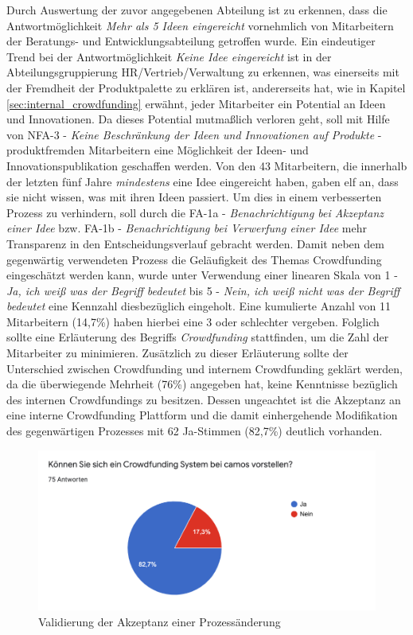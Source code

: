 Durch Auswertung der zuvor angegebenen Abteilung ist zu erkennen, dass die Antwortmöglichkeit \emph{Mehr als 5 Ideen eingereicht} vornehmlich von Mitarbeitern der Beratungs- und Entwicklungsabteilung getroffen wurde. Ein eindeutiger Trend bei der Antwortmöglichkeit \emph{Keine Idee eingereicht} ist in der Abteilungsgruppierung HR/Vertrieb/Verwaltung zu erkennen, was einerseits mit der Fremdheit der Produktpalette zu erklären ist, andererseits hat, wie in Kapitel \ref{sec:internal_crowdfunding} erwähnt, jeder Mitarbeiter ein Potential an Ideen und Innovationen. Da dieses Potential mutmaßlich verloren geht, soll mit Hilfe von \ac{NFA}-3 - \emph{Keine Beschränkung der Ideen und Innovationen auf Produkte} - produktfremden Mitarbeitern eine Möglichkeit der Ideen- und Innovationspublikation geschaffen werden. Von den 43 Mitarbeitern, die innerhalb der letzten fünf Jahre \emph{mindestens} eine Idee eingereicht haben, gaben elf an, dass sie nicht wissen, was mit ihren Ideen passiert. Um dies in einem verbesserten Prozess zu verhindern, soll durch die \ac{FA}-1a - \emph{Benachrichtigung bei Akzeptanz einer Idee} bzw. \ac{FA}-1b - \emph{Benachrichtigung bei Verwerfung einer Idee} mehr Transparenz in den Entscheidungsverlauf gebracht werden. Damit neben dem gegenwärtig verwendeten Prozess die Geläufigkeit des Themas Crowdfunding eingeschätzt werden kann, wurde unter Verwendung einer linearen Skala von 1 - \emph{Ja, ich weiß was der Begriff bedeutet} bis 5 - \emph{Nein, ich weiß nicht was der Begriff bedeutet} eine Kennzahl diesbezüglich eingeholt. Eine kumulierte Anzahl von 11 Mitarbeitern (14,7\%) haben hierbei eine \glqq{}3\grqq{} oder schlechter vergeben. Folglich sollte eine Erläuterung des Begriffs \emph{Crowdfunding} stattfinden, um die Zahl der Mitarbeiter zu minimieren. Zusätzlich zu dieser Erläuterung sollte der Unterschied zwischen Crowdfunding und internem Crowdfunding geklärt werden, da die überwiegende Mehrheit (76\%) angegeben hat, keine Kenntnisse bezüglich des internen Crowdfundings zu besitzen. Dessen ungeachtet ist die Akzeptanz an eine interne Crowdfunding Plattform und die damit einhergehende Modifikation des gegenwärtigen Prozesses mit 62 Ja-Stimmen (82,7\%) deutlich vorhanden. 
\begin{figure}[t]
	\centering
	\includegraphics[width=\textwidth]{images/Frage9}
	\caption{Validierung der Akzeptanz einer Prozessänderung}
	\label{fig:frage9}
\end{figure} 
